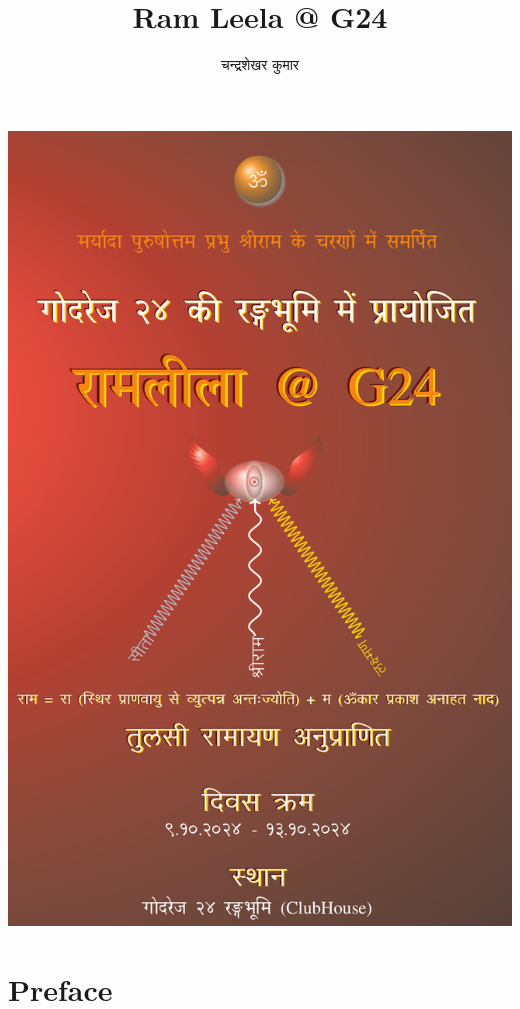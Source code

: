 \documentclass[makeidx, 10pt, oneside, onecolumn, openright, final, svgnames, dvipsnames, extrafontsizes]{memoir}
\title{ Ram Leela @ G24}
\author{चन्द्रशेखर कुमार}
\begin{document}
\thispagestyle{empty}

\begin{center}
\color{BurntOrange} \Large
\includegraphics{front}
\end{center}

\renewcommand{\contentsname}{अनुक्रमणिका}
\renewcommand{\chaptername}{अध्याय}



\tableofcontents*


\chapter[प्राक्कथन]{Preface}
\thispagestyle{empty}
\end{document}
